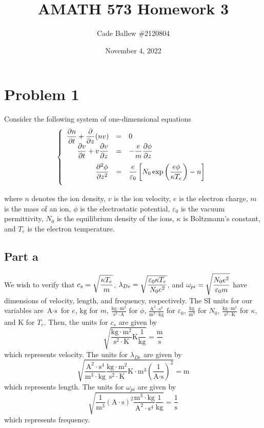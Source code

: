 \documentclass{article}
\title{AMATH 573 Homework 3}
\author{Cade Ballew \#2120804}
\date{November 4, 2022}
\begin{document}
	
\maketitle
	
\section{Problem 1}
Consider the following system of one-dimensional equations
\[
\sys{
	\ds \pp{n}{t}+\pp{}{z}(nv)&=&0\\
	\vs\ds \pp{v}{t}+v\pp{v}{z}&=&\ds -\frac{e}{m}\pp{\phi}{z}\\
	\vs \ds \ppn{2}{\phi}{z}&=&\ds \frac{e}{\varepsilon_0}\left[N_0 \exp\left(\frac{e\phi}{\kappa T_e}\right)-n\right]
}
\]

\no where $n$ denotes the ion density, $v$ is the ion velocity, $e$ is the electron charge, $m$ is the
mass of an ion, $\phi$ is the electrostatic potential, $\varepsilon_0$ is the vacuum permittivity, $N_0$ is the
equilibrium density of the ions, $\kappa$ is Boltzmann's constant, and $T_e$ is the electron temperature.
\subsection{Part a}
We wish to verify that $\displaystyle c_s=\sqrt{\frac{\kappa T_e}{m}}$,
$\displaystyle \lambda_{De}=\sqrt{\frac{\varepsilon_0 \kappa T_e}{N_0 e^2}}$, and
$\displaystyle \omega_{pi}=\sqrt{\frac{N_0 e^2}{\varepsilon_0 m}}$ have dimensions of velocity,
length, and frequency, respectively. The SI units for our variables are $\text{A}\cdot{\text{s}}$ for $e$, $\text{kg}$ for $m$, $\frac{\text{kg}\cdot\text{m}^2}{\text{s}^3\cdot\text{A}}$ for $\phi$, $\frac{\text{A}^2\cdot\text{s}^4}{\text{m}^3\cdot\text{kg}}$ for $\varepsilon_0$, $\frac{\text{kg}}{\text{m}^3}$ for $N_0$, $\frac{\text{kg}\cdot\text{m}^2}{\text{s}^2\cdot\text{K}}$ for $\kappa$, and $\text{K}$ for $T_e$. Then, the units for $c_s$ are given by
\[
\sqrt{\frac{\text{kg}\cdot\text{m}^2}{\text{s}^2\cdot\text{K}}\text{K}\frac{1}{\text{kg}}}=\frac{\text{m}}{\text{s}}
\]
which represents velocity. The units for $\lambda_{De}$ are given by
\[
\sqrt{\frac{\text{A}^2\cdot\text{s}^4}{\text{m}^3\cdot\text{kg}}\frac{\text{kg}\cdot\text{m}^2}{\text{s}^2\cdot\text{K}}\text{K}\cdot\text{m}^3\left(\frac{1}{\text{A}\cdot{\text{s}}}\right)^2}=\text{m}
\]
which represents length. The units for $\omega_{pi}$ are given by
\[
\sqrt{\frac{\text{1}}{\text{m}^3}(\text{A}\cdot{\text{s}})^2\frac{\text{m}^3\cdot\text{kg}}{\text{A}^2\cdot\text{s}^4}\frac{1}{\text{kg}}}=\frac{1}{\text{s}}
\]
which represents frequency.
\end{document}
